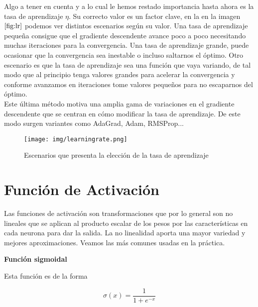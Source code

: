 	 Algo a tener en cuenta y a lo cual le hemos restado importancia hasta ahora es la tasa de aprendizaje $\eta$. Su correcto valor es un factor clave, en la en la imagen $\ref{fig:lr}$ podemos ver distintos escenarios según su valor. Una tasa de aprendizaje pequeña consigue que el gradiente descendente avance poco a poco necesitando muchas iteraciones para la convergencia. Una tasa de aprendizaje grande, puede ocasionar que la convergencia sea inestable o incluso saltarnos el óptimo. Otro escenario es que la tasa de aprendizaje sea una función que vaya variando, de tal modo que al principio tenga valores grandes para acelerar la convergencia y conforme avanzamos en iteraciones tome valores pequeños para no escaparnos del óptimo. \\
	 
	 Este última método motiva una amplia gama de variaciones en el gradiente descendente que se centran en cómo modificar la tasa de aprendizaje. De este modo surgen variantes como AdaGrad, Adam, RMSProp...
	 
	 \begin{figure}[H]
	     \centering
	     \texttt{[image: img/learningrate.png]}
	     \caption{Escenarios que presenta la elección de la tasa de aprendizaje}
	     \label{fig:lr}
	 \end{figure}


       
        
        
\section{Función de Activación}
    
    Las funciones de activación son transformaciones que por lo general son no lineales que se aplican al producto escalar de los pesos por las características en cada neurona para dar la salida. La no linealidad aporta una mayor variedad y mejores aproximaciones. Veamos las más comunes usadas en la práctica. \\
    
    \begin{center}
        \textbf{Función sigmoidal} \\
    \end{center}
    
        Esta función es de la forma
        
        \begin{equation}
            \sigma(x) = \frac{1}{1 + e^{-x}}
        \end{equation}
        
